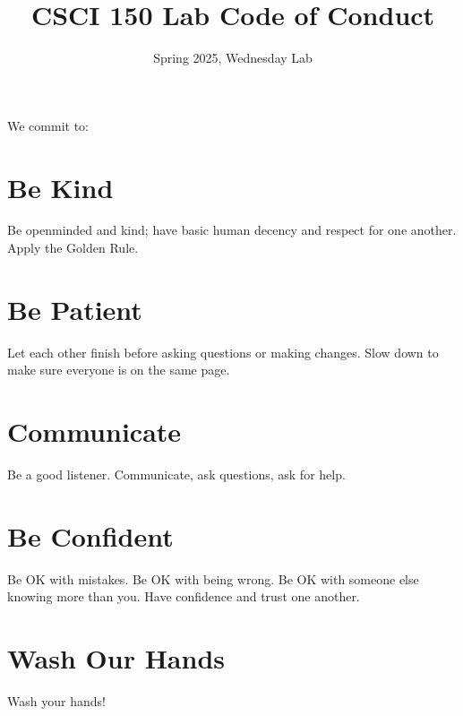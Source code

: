 \documentclass{tufte-handout}
\title{CSCI 150 Lab Code of Conduct}
\date{Spring 2025, Wednesday Lab}
\begin{document}
\maketitle

We commit to:

\section{Be Kind}

Be openminded and kind; have basic human decency and respect for one
another.  Apply the Golden Rule.

\section{Be Patient}

Let each other finish before asking questions or making changes.  Slow
down to make sure everyone is on the same page.

\section{Communicate}

Be a good listener. Communicate, ask questions, ask for help.

\section{Be Confident}

Be OK with mistakes.  Be OK with being wrong.
Be OK with someone else knowing more than you.
Have confidence and trust one another.

\section{Wash Our Hands}

Wash your hands!


\end{document}
